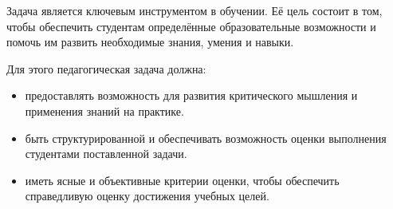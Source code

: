 Задача является ключевым инструментом в обучении. 
Её цель состоит в том, чтобы обеспечить студентам определённые образовательные возможности и помочь им развить необходимые знания, умения и навыки.



 Для этого педагогическая задача должна:
\begin{itemize}
    \item предоставлять возможность для развития критического мышления и применения знаний на практике.
    \item быть структурированной и обеспечивать возможность оценки выполнения студентами поставленной задачи.
    \item иметь ясные и объективные критерии оценки, чтобы обеспечить справедливую оценку достижения учебных целей.
\end{itemize}





